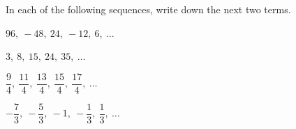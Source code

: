  In each of the following sequences, write down the next two terms.

\begin{subparts}
  \item $96,\ -48,\ 24,\ -12,\ 6,\ \ldots$
  \item $3,\ 8,\ 15,\ 24,\ 35,\ \ldots$
  \item $\dfrac{9}{4},\ \dfrac{11}{4},\ \dfrac{13}{4},\ \dfrac{15}{4},\ \dfrac{17}{4},\ \ldots$
  \item $-\dfrac{7}{3},\ -\dfrac{5}{3},\ -1,\ -\dfrac{1}{3},\ \dfrac{1}{3},\ \ldots$
\end{subparts}

